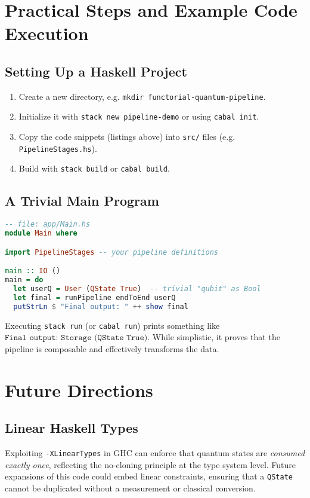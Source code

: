 \documentclass[12pt]{article}
\begin{document}
\section{Practical Steps and Example Code Execution}

\subsection{Setting Up a Haskell Project}
\begin{enumerate}
\item Create a new directory, e.g. \texttt{mkdir functorial-quantum-pipeline}.
\item Initialize it with \texttt{stack new pipeline-demo} or using
\texttt{cabal init}.
\item Copy the code snippets (listings above) into \texttt{src/} files
(e.g. \texttt{PipelineStages.hs}).
\item Build with \texttt{stack build} or \texttt{cabal build}.
\end{enumerate}

\subsection{A Trivial Main Program}
\begin{lstlisting}[language=Haskell,caption={Main entry point example.},float]
-- file: app/Main.hs
module Main where

import PipelineStages -- your pipeline definitions

main :: IO ()
main = do
  let userQ = User (QState True)  -- trivial "qubit" as Bool
  let final = runPipeline endToEnd userQ
  putStrLn $ "Final output: " ++ show final
\end{lstlisting}

Executing \texttt{stack run} (or \texttt{cabal run}) prints something
like \(\texttt{Final output: Storage (QState True)}\). While simplistic,
it proves that the pipeline is composable and effectively transforms
the data.

\section{Future Directions}

\subsection{Linear Haskell Types}
Exploiting \texttt{-XLinearTypes} in GHC can enforce that quantum
states are \emph{consumed exactly once}, reflecting the no-cloning
principle at the type system level. Future expansions of this code
could embed linear constraints, ensuring that a \texttt{QState}
cannot be duplicated without a measurement or classical conversion.
\end{document}
